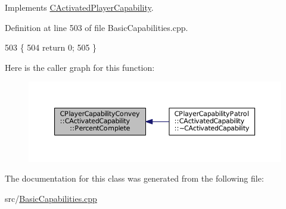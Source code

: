 Implements \hyperlink{classCActivatedPlayerCapability_a405dc6076058006a4f801727de4cfe4d}{C\+Activated\+Player\+Capability}.



Definition at line 503 of file Basic\+Capabilities.\+cpp.


\begin{DoxyCode}
503                                                                        \{
504     \textcolor{keywordflow}{return} 0;
505 \}
\end{DoxyCode}
Here is the caller graph for this function\+:
\nopagebreak
\begin{figure}[H]
\begin{center}
\leavevmode
\includegraphics[width=350pt]{classCPlayerCapabilityConvey_1_1CActivatedCapability_aec6b75fc004f4ac18755d8f601c8ffca_icgraph}
\end{center}
\end{figure}


The documentation for this class was generated from the following file\+:\begin{DoxyCompactItemize}
\item 
src/\hyperlink{BasicCapabilities_8cpp}{Basic\+Capabilities.\+cpp}\end{DoxyCompactItemize}
